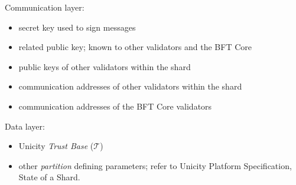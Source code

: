 Communication layer:

\begin{itemize}
  \item secret key used to sign messages
  \item related public key; known to other validators and the BFT Core
  \item public keys of other validators within the shard
  \item communication addresses of other validators within the shard
  \item communication addresses of the BFT Core validators
\end{itemize}

Data layer:

\begin{itemize}
  \item Unicity \emph{Trust Base} ($\mathcal{T}$)
  \item other \emph{partition} defining parameters; refer to Unicity Platform Specification, State of a Shard.
\end{itemize}

